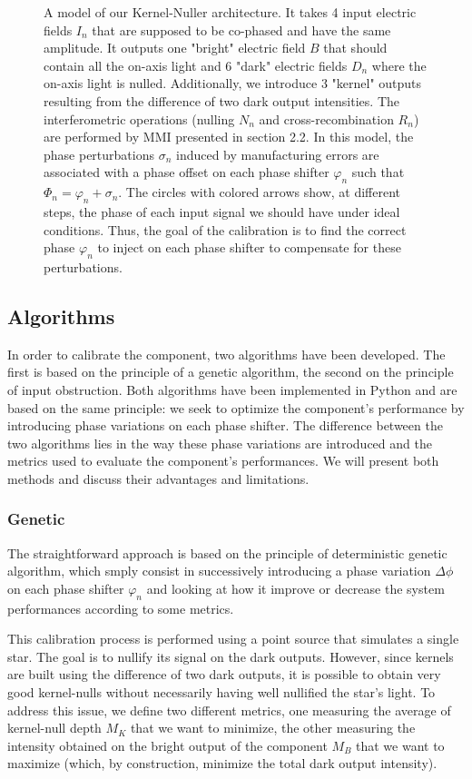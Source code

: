 \documentclass{aa}
\begin{document}
\begin{figure}
{        A model of our Kernel-Nuller architecture. It takes 4 input electric fields $I_n$ that are supposed to be co-phased and have the same amplitude. It outputs one "bright" electric field $B$ that should contain all the on-axis light and 6 "dark" electric fields $D_n$ where the on-axis light is nulled. Additionally, we introduce 3 "kernel" outputs resulting from the difference of two dark output intensities. The interferometric operations (nulling $N_n$ and cross-recombination $R_n$) are performed by MMI presented in section 2.2. In this model, the phase perturbations $\sigma_n$ induced by manufacturing errors are associated with a phase offset on each phase shifter $\varphi_n$ such that $\Phi_n = \varphi_n + \sigma_n$. The circles with colored arrows show, at different steps, the phase of each input signal we should have under ideal conditions. Thus, the goal of the calibration is to find the correct phase $\varphi_n$ to inject on each phase shifter to compensate for these perturbations.}
    \end{figure}

    \subsection{Algorithms}

        In order to calibrate the component, two algorithms have been developed. The first is based on the principle of a genetic algorithm, the second on the principle of input obstruction. Both algorithms have been implemented in Python and are based on the same principle: we seek to optimize the component's performance by introducing phase variations on each phase shifter. The difference between the two algorithms lies in the way these phase variations are introduced and the metrics used to evaluate the component's performances. We will present both methods and discuss their advantages and limitations.

        \subsubsection{Genetic}
            The straightforward approach is based on the principle of deterministic genetic algorithm, which smply consist in successively introducing a phase variation $\Delta \phi$ on each phase shifter $\varphi_n$ and looking at how it improve or decrease the system performances according to some metrics.

            This calibration process is performed using a point source that simulates a single star. The goal is to nullify its signal on the dark outputs. However, since kernels are built using the difference of two dark outputs, it is possible to obtain very good kernel-nulls without necessarily having well nullified the star's light. To address this issue, we define two different metrics, one measuring the average of kernel-null depth $M_K$ that we want to minimize, the other measuring the intensity obtained on the bright output of the component $M_B$ that we want to maximize (which, by construction, minimize the total dark output intensity).
            
\end{document}
